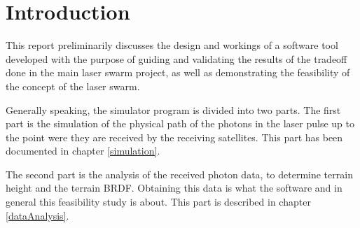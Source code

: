 \chapter{Introduction}
\label{intro}
This report preliminarily discusses the design and workings of a software tool developed with the purpose of guiding and validating the results of the tradeoff done in the main laser swarm project, as well as demonstrating the feasibility of the concept of the laser swarm.

Generally speaking, the simulator program is divided into two parts. The first part is the simulation of the physical path of the photons in the laser pulse up to the point were they are received by the receiving satellites. This part has been documented in chapter \ref{simulation}.

The second part is the analysis of the received photon data, to determine terrain height and the terrain \ac{BRDF}. Obtaining this data is what the software and in general this feasibility study is about. This part is described in chapter \ref{dataAnalysis}.

